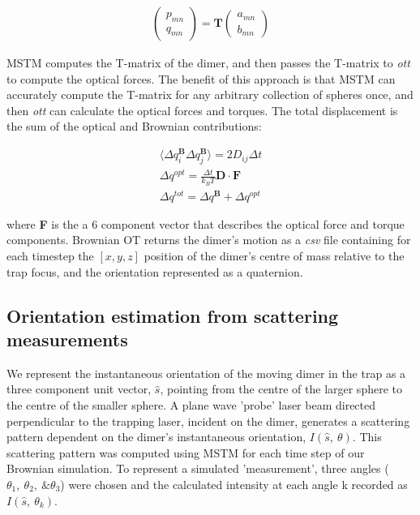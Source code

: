 \documentclass[final, 3p]{elsarticle}
\begin{document}
\begin{align}
	\begin{pmatrix}
		p_{mn} \\
		q_{mn}
	\end{pmatrix}
	= \textbf{T}
	\begin{pmatrix}
		a_{mn} \\
		b_{mn}
	\end{pmatrix}
\end{align}

MSTM computes the T-matrix of the dimer, and then passes the T-matrix to \textit{ott} to compute the optical forces. The benefit of this approach is that MSTM can accurately compute the T-matrix for any arbitrary collection of spheres once, and then \textit{ott} can calculate the optical forces and torques. The total displacement is the sum of the optical and Brownian contributions:

\begin{align}
	\langle \Delta q_i^{\textbf{B}} \Delta q_j^{\textbf{B}}\rangle = 2D_{ij} \Delta t \\
	\Delta q^{opt} = \frac{\Delta t}{k_BT}\textbf{D} \cdot \textbf{F} \\
	\Delta q^{tot} = \Delta q^{\textbf{B}} + \Delta q^{opt}
\end{align}

where \textbf{F} is the a 6 component vector that describes the optical force and torque components. Brownian OT returns the dimer's motion as a \textit{csv} file containing for each timestep the $[x,y,z]$ position of the dimer's centre of mass relative to the trap focus, and the orientation represented as a quaternion. 

\subsection{Orientation estimation from scattering measurements}
\label{sec:2.2}

We represent the instantaneous orientation of the moving dimer in the trap as a three component unit vector,  $\hat{s}$, pointing from the centre of the larger sphere to the centre of the smaller sphere. A plane wave 'probe' laser beam directed perpendicular to the trapping laser, incident on the dimer, generates a scattering pattern dependent on the dimer's instantaneous orientation,  $I(\hat{s},\ \theta)$. This scattering pattern was computed using MSTM for each time step of our Brownian simulation. To represent a simulated 'measurement', three angles ($\theta_1,\ \theta_2,\ \& \theta_3$) were chosen and the calculated  intensity at each angle k recorded as $I(\hat{s},\ \theta_k)$. 
\end{document}

